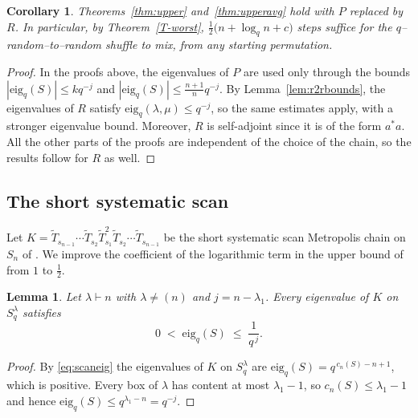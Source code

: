 \documentclass[11pt]{article}
\theoremstyle{plain}  %
\newtheorem{corollary}[theorem]{Corollary}
\newtheorem{lemma}[theorem]{Lemma}
\newcommand{\eig}{\text{eig}} %
\begin{document}
\begin{corollary}\label{cor:r2r}
Theorems~\ref{thm:upper} and~\ref{thm:upperavg}  hold with $P$ replaced by $R$.
In particular, by Theorem~\ref{T-worst}, $\frac12\bigl(n+\log_q n+c\bigr)$ steps suffice for the
$q$--random--to--random shuffle to mix, from any starting permutation.
\end{corollary}

\begin{proof}
In the proofs above, the eigenvalues of $P$ are used only through the bounds
$|\eig_q(S)| \le kq^{-j}$ and $|\eig_q(S)| \le \frac{n+1}{n}q^{-j}$.
By Lemma~\ref{lem:r2rbounds}, the eigenvalues of $R$ satisfy
$\eig_q(\lambda,\mu) \le q^{-j}$, so the same estimates apply, with a stronger
eigenvalue bound. Moreover, $R$ is self-adjoint since it is of the form
$a^{*}a$. All the other parts of the proofs are independent of the choice of
the chain, so the results follow for $R$ as well.
\end{proof}


\subsection{The short systematic scan}\label{sec:scan-upper}

Let $K = \widetilde{T}_{s_{n-1}}\cdots\widetilde{T}_{s_{2}}\widetilde{T}_{s_{1}}^{2}
\widetilde{T}_{s_{2}}\cdots\widetilde{T}_{s_{n-1}}$ be the short systematic
scan Metropolis chain on $S_n$ of \cite{DiaconisRam2000}. We improve the
coefficient of the logarithmic term in the upper bound of \cite{DiaconisRam2000}
from $1$ to $\frac12$.

\begin{lemma}\label{lem:scan}
Let $\lambda \vdash n$ with $\lambda \ne (n)$ and $j = n-\lambda_1$. Every
eigenvalue of $K$ on $S^{\lambda}_q$ satisfies
$$
  0 \;<\; \eig_q(S) \;\le\; \frac{1}{q^{\,j}} .
$$
\end{lemma}

\begin{proof}
By \eqref{eq:scaneig} the eigenvalues of $K$ on $S^{\lambda}_q$ are
$\eig_q(S) = q^{\,c_n(S)-n+1}$, which is positive. Every box of $\lambda$ has content at
most $\lambda_1-1$, so $c_n(S) \le \lambda_1-1$ and hence
$\eig_q(S) \le q^{\lambda_1-n} = q^{-j}$.
\end{proof}

\end{document}
